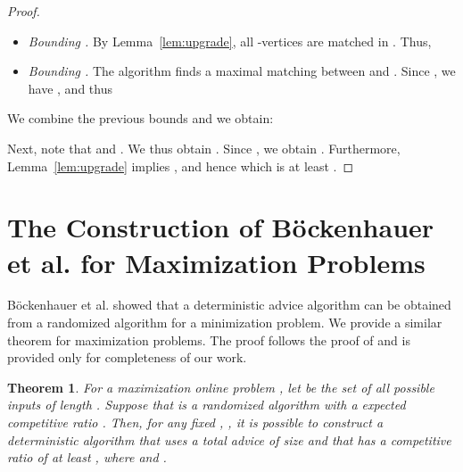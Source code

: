 \documentclass[a4paper]{article}
\newtheorem{theorem}{Theorem}
\begin{document}
\begin{proof}
\begin{itemize}
 \item \textit{Bounding .} By Lemma~\ref{lem:upgrade}, all -vertices are matched in . Thus,
 

 \item \textit{Bounding .} The algorithm finds a maximal matching between  and
 . Since , we have
 ,
 and thus 
 \end{itemize}

\noindent We combine the previous bounds and we obtain:
 
Next, note that  and . We thus
obtain . Since
, we obtain . Furthermore,
Lemma~\ref{lem:upgrade} implies , and hence
 which is at least .
\end{proof}





\newpage
\appendix


\section{The Construction of B\"{o}ckenhauer et al. for Maximization Problems}
\label{appendix:boeckenhauer}

B\"{o}ckenhauer et al. \cite{bkkk11} showed that a deterministic advice algorithm can be obtained
from a randomized algorithm for a minimization problem. We provide a similar theorem for maximization
problems. The proof follows the proof of \cite{bkkk11} and is provided only for completeness of our work.
\label{sec:min-to-max}
\begin{theorem}
  For a maximization online problem , let  be the set of all possible inputs of
  length . Suppose that  is a randomized algorithm with a expected competitive ratio
  . Then, for any fixed , , it is possible to construct a deterministic
  algorithm that uses a total advice of size
   and that has a competitive ratio of at least
  , where  and .
\end{theorem}
\end{document}
